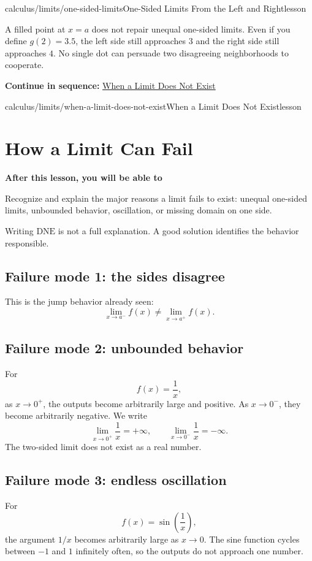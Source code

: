 \documentclass[11pt,openany]{book}
\theoremstyle{bgplain}
\newcommand{\webnext}[2]{%
  \par\addvspace{1.2em}\noindent{\color{BGLine}\rule{\textwidth}{0.35pt}}\par\smallskip
  {\small\color{BGGray}\textbf{Continue in sequence:} \hyperlink{web:#1}{#2}}\par
}
\newcommand{\lessonobjective}[1]{%
  \par\Needspace{4\baselineskip}\addvspace{0.6em}%
  {\bfseries\color{BGInk}After this lesson, you will be able to}\par\smallskip
  #1\par\addvspace{0.5em}%
}
\newcommand{\DNE}{\mathrm{DNE}}
\begin{document}
\begin{webpage}{calculus/limits/one-sided-limits}{One-Sided Limits From the Left and Right}{lesson}
\begin{bgexamnote}
A filled point at \(x=a\) does not repair unequal one-sided limits. Even if you define \(g(2)=3.5\), the left side still approaches \(3\) and the right side still approaches \(4\). No single dot can persuade two disagreeing neighborhoods to cooperate.
\end{bgexamnote}
\webnext{calculus/limits/when-a-limit-does-not-exist}{When a Limit Does Not Exist}
\end{webpage}

\begin{webpage}{calculus/limits/when-a-limit-does-not-exist}{When a Limit Does Not Exist}{lesson}
\section{How a Limit Can Fail}

\lessonobjective{
Recognize and explain the major reasons a limit fails to exist: unequal one-sided limits, unbounded behavior, oscillation, or missing domain on one side.
}

Writing \(\DNE\) is not a full explanation. A good solution identifies the behavior responsible.

\subsection{Failure mode 1: the sides disagree}

This is the jump behavior already seen:
\[
  \lim_{x\to a^-}f(x)\ne\lim_{x\to a^+}f(x).
\]

\subsection{Failure mode 2: unbounded behavior}

For
\[
  f(x)=\frac1x,
\]
as \(x\to0^+\), the outputs become arbitrarily large and positive. As \(x\to0^-\), they become arbitrarily negative. We write
\[
  \lim_{x\to0^+}\frac1x=+\infty,
  \qquad
  \lim_{x\to0^-}\frac1x=-\infty.
\]
The two-sided limit does not exist as a real number.

\subsection{Failure mode 3: endless oscillation}

For
\[
  f(x)=\sin\left(\frac1x\right),
\]
the argument \(1/x\) becomes arbitrarily large as \(x\to0\). The sine function cycles between \(-1\) and \(1\) infinitely often, so the outputs do not approach one number.


\end{webpage}
\end{document}
